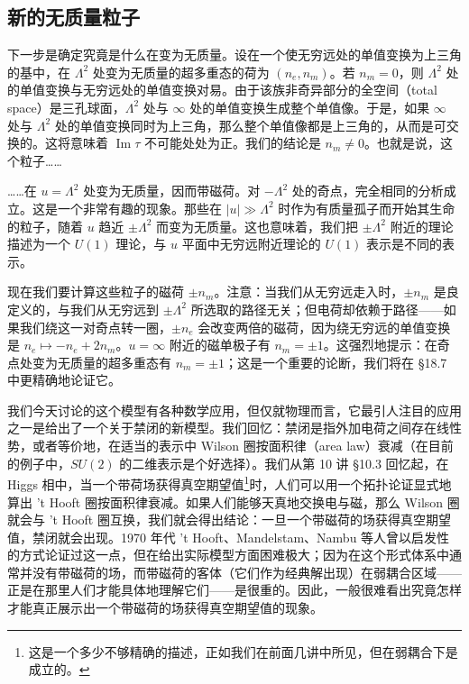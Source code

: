\subsection{新的无质量粒子}

下一步是确定究竟是什么在变为无质量。设在一个使无穷远处的单值变换为上三角的基中，在 $\Lambda^2$ 处变为无质量的超多重态的荷为 $(n_e,n_m)$。若 $n_m=0$，则 $\Lambda^2$ 处的单值变换与无穷远处的单值变换对易。由于该族非奇异部分的全空间（total space）是三孔球面，$\Lambda^2$ 处与 $\infty$ 处的单值变换生成整个单值像。于是，如果 $\infty$ 处与 $\Lambda^2$ 处的单值变换同时为上三角，那么整个单值像都是上三角的，从而是可交换的。这将意味着 $\operatorname{Im}\tau$ 不可能处处为正。我们的结论是 $n_m\neq0$。也就是说，这个粒子……


……在 $u=\Lambda^2$ 处变为无质量，因而带磁荷。对 $-\Lambda^2$ 处的奇点，完全相同的分析成立。这是一个非常有趣的现象。那些在 $|u|\gg\Lambda^2$ 时作为有质量孤子而开始其生命的粒子，随着 $u$ 趋近 $\pm\Lambda^2$ 而变为无质量。这也意味着，我们把 $\pm\Lambda^2$ 附近的理论描述为一个 $U(1)$ 理论，与 $u$ 平面中无穷远附近理论的 $U(1)$ 表示是不同的表示。

现在我们要计算这些粒子的磁荷 $\pm n_m$。注意：当我们从无穷远走入时，$\pm n_m$ 是良定义的，与我们从无穷远到 $\pm\Lambda^2$ 所选取的路径无关；但电荷却依赖于路径——如果我们绕这一对奇点转一圈，$\pm n_e$ 会改变两倍的磁荷，因为绕无穷远的单值变换是 $n_e\mapsto-n_e+2n_m$。$u=\infty$ 附近的磁单极子有 $n_m=\pm1$。这强烈地提示：在奇点处变为无质量的超多重态有 $n_m=\pm1$；这是一个重要的论断，我们将在 §18.7 中更精确地论证它。

我们今天讨论的这个模型有各种数学应用，但仅就物理而言，它最引人注目的应用之一是给出了一个关于禁闭的新模型。我们回忆：禁闭是指外加电荷之间存在线性势，或者等价地，在适当的表示中 Wilson 圈按面积律（area law）衰减（在目前的例子中，$SU(2)$ 的二维表示是个好选择）。我们从第 10 讲 §10.3 回忆起，在 Higgs 相中，当一个带荷场获得真空期望值\footnote{这是一个多少不够精确的描述，正如我们在前面几讲中所见，但在弱耦合下是成立的。}时，人们可以用一个拓扑论证显式地算出 't Hooft 圈按面积律衰减。如果人们能够天真地交换电与磁，那么 Wilson 圈就会与 't Hooft 圈互换，我们就会得出结论：一旦一个带磁荷的场获得真空期望值，禁闭就会出现。1970 年代 't Hooft、Mandelstam、Nambu 等人曾以启发性的方式论证过这一点，但在给出实际模型方面困难极大；因为在这个形式体系中通常并没有带磁荷的场，而带磁荷的客体（它们作为经典解出现）在弱耦合区域——正是在那里人们才能具体地理解它们——是很重的。因此，一般很难看出究竟怎样才能真正展示出一个带磁荷的场获得真空期望值的现象。

